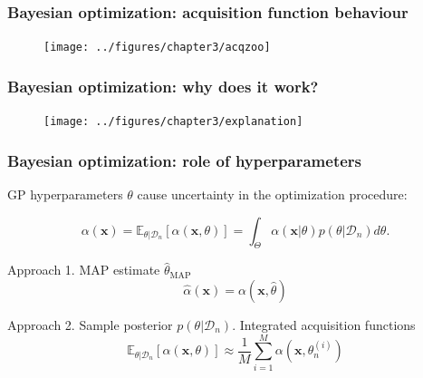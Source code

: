 \documentclass[10pt]{beamer}
\begin{document}
		\begin{frame}
		\frametitle{Bayesian optimization: acquisition function behaviour}
		\begin{figure}
		\texttt{[image: ../figures/chapter3/acqzoo]}
		\end{figure}
		\end{frame}
		
		\begin{frame}
		\frametitle{Bayesian optimization: why does it work?}
		\begin{figure}
		\texttt{[image: ../figures/chapter3/explanation]}
		\end{figure}
		\end{frame}
		
		\begin{frame}
		\frametitle{Bayesian optimization: role of hyperparameters}
		
		GP hyperparameters $\theta$ cause uncertainty in the optimization procedure:		
		
		\begin{equation}
		\alpha(\boldsymbol{x}) = \mathbb{E}_{\theta|\mathcal{D}_n}\left[ \alpha(\boldsymbol{x}, \theta) \right] 		= \int_{\Theta} \alpha(\boldsymbol{x}|\theta)p(\theta|\mathcal{D}_n)d\theta.
		\end{equation}
		
		\begin{block}{Approach 1. MAP estimate $\hat{\theta}_{\mathrm{MAP}}$}
		\begin{equation}
		\hat{\alpha}(\boldsymbol{x}) = \alpha(\boldsymbol{x}, \hat{\theta})
		\end{equation}
		\end{block}
		
		\begin{block}{Approach 2. Sample posterior $p(\theta|\mathcal{D}_n)$. Integrated acquisition functions}
		\begin{equation}
	\mathbb{E}_{\theta|\mathcal{D}_n}\left[ \alpha(\boldsymbol{x},\theta )\right] \approx \dfrac{1}{M} 				\sum_{i=1}^M \alpha(\boldsymbol{x},\theta_n^{(i)})
	\end{equation}
		\end{block}
		\end{frame}
		
\end{document}
